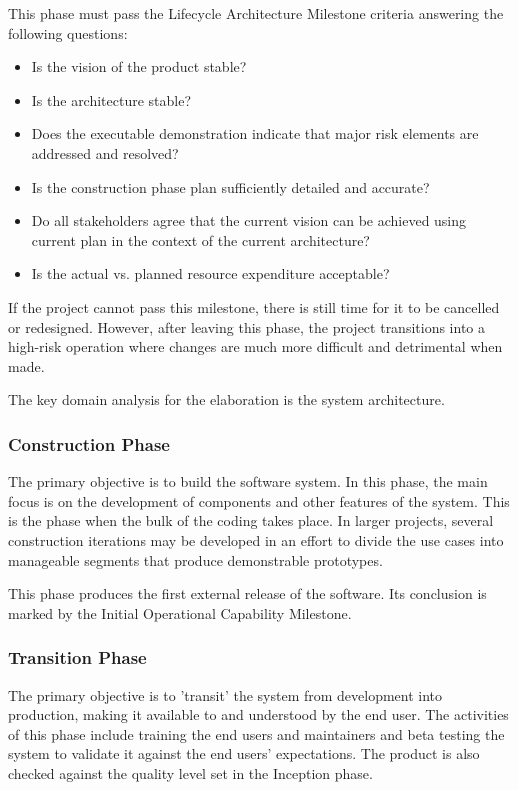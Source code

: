 This phase must pass the Lifecycle Architecture Milestone criteria answering the following questions:
\begin{itemize}
\item Is the vision of the product stable?
\item Is the architecture stable?
\item Does the executable demonstration indicate that major risk elements are addressed and resolved?
\item Is the construction phase plan sufficiently detailed and accurate?
\item Do all stakeholders agree that the current vision can be achieved using current plan in the context of the current architecture?
\item Is the actual vs. planned resource expenditure acceptable?
\end{itemize}

If the project cannot pass this milestone, there is still time for it to be cancelled or redesigned. However, after leaving this phase, the project transitions into a high-risk operation where changes are much more difficult and detrimental when made.

The key domain analysis for the elaboration is the system architecture.

\subsubsection{Construction Phase}

The primary objective is to build the software system. In this phase, the main focus is on the development of components and other features of the system. This is the phase when the bulk of the coding takes place. In larger projects, several construction iterations may be developed in an effort to divide the use cases into manageable segments that produce demonstrable prototypes.

This phase produces the first external release of the software. Its conclusion is marked by the Initial Operational Capability Milestone.

\subsubsection{Transition Phase}
The primary objective is to 'transit' the system from development into production, making it available to and understood by the end user. The activities of this phase include training the end users and maintainers and beta testing the system to validate it against the end users' expectations. The product is also checked against the quality level set in the Inception phase.

